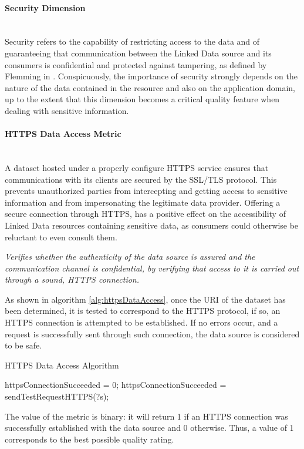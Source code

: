 

\paragraph{Security Dimension}~\\ %
Security refers to the capability of restricting access to the data and of guaranteeing that communication between the Linked Data source and its consumers is confidential and protected against tampering, as defined by Flemming in \cite{Flemming2008}. Conspicuously, the importance of security strongly depends on the nature of the data contained in the resource and also on the application domain, up to the extent that this dimension becomes a critical quality feature when dealing with sensitive information.


\paragraph{HTTPS Data Access Metric} ~\\ %
A dataset hosted under a properly configure HTTPS service ensures that communications with its clients are secured by the SSL/TLS protocol. This prevents unauthorized parties from intercepting and getting access to sensitive information and from impersonating the legitimate data provider. Offering a secure connection through HTTPS, has a positive effect on the accessibility of Linked Data resources containing sensitive data, as consumers could otherwise be reluctant to even consult them.

\begin{mdframed}[style=metricdefinition]
\emph{Verifies whether the authenticity of the data source is assured and the communication channel is confidential, by verifying that access to it is carried out through a sound, HTTPS connection.}
\end{mdframed}

As shown in algorithm \ref{alg:httpsDataAccess}, once the URI of the dataset has been determined, it is tested to correspond to the HTTPS protocol, if so, an HTTPS connection is attempted to be established. If no errors occur, and a request is successfully sent through such connection, the data source is considered to be safe.
\begin{algorithm}
\caption{HTTPS Data Access Algorithm} \label{alg:httpsDataAccess}
\begin{algorithmic}[1]
\State httpsConnectionSucceeded = 0;
\EndProcedure
{}
\State httpsConnectionSucceeded = sendTestRequestHTTPS(?s);
\EndIf
{}
\EndProcedure
\end{algorithmic}
\end{algorithm}
The value of the metric is binary: it will return 1 if an HTTPS connection was successfully established with the data source and 0 otherwise. Thus, a value of 1 corresponds to the best possible quality rating.

